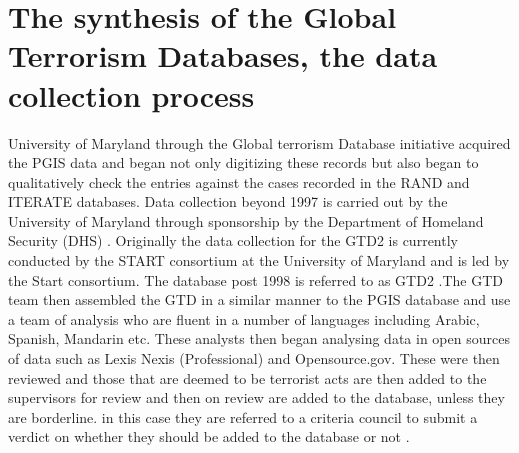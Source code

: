 \section{The synthesis of the Global Terrorism Databases, the data collection process}
\label{sec:synglobalter}
University of Maryland through the Global terrorism Database initiative acquired the PGIS data and began not only digitizing these records but also began to qualitatively check the entries against the cases recorded in the RAND and ITERATE databases. Data collection beyond 1997 is carried out by the University of Maryland through sponsorship by the Department of Homeland Security (DHS) \citep{lafree2011building}. Originally the data collection for the GTD2 is currently conducted by the START \citep{startGTD2016} consortium at the University of Maryland and is led by the Start consortium. The database post 1998 is referred to as GTD2 \citep{lafree2010global}.The GTD team then assembled the GTD in a similar manner to the PGIS database and use a team of analysis who are fluent in a number of languages including Arabic, Spanish, Mandarin etc. These analysts then began analysing data in open sources of data such as Lexis Nexis (Professional) and Opensource.gov. These were then reviewed and those that are deemed to be terrorist acts are then added to the supervisors for review and then on review are added to the database, unless they are borderline. in this case they are referred to a criteria council to submit a verdict on whether they should be added to the database or not \citep{lafree2012generating}.

